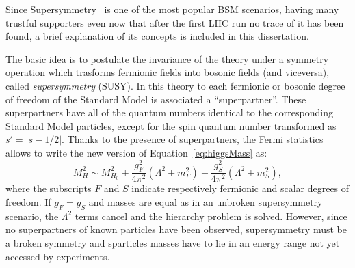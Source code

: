 Since Supersymmetry~\cite{Wess:320631} is one of the most popular
BSM scenarios, having many trustful supporters even
now that after the first LHC run no trace of it
has been found, a brief explanation of its concepts
is included in this dissertation.

The basic idea is to postulate the invariance 
of the theory under a symmetry operation which 
trasforms fermionic fields into bosonic fields 
(and viceversa), called \textit{supersymmetry} (SUSY). 
In this theory to each fermionic or bosonic 
degree of freedom of the Standard Model is associated a 
``superpartner''. These superpartners have all 
of the quantum numbers identical to the corresponding 
Standard Model particles, except for the spin quantum number 
transformed as $s' = |s - 1/2|$. Thanks to the 
presence of superpartners, the Fermi statistics 
allows to write the new version of Equation~\ref{eq:higgsMass} as:
\begin{equation}
\label{eq:higgsMassSUSY}
M_{H}^{2} \sim M_{H_{0}}^{2} + \dfrac{g_{F}^{2}}{4\pi^{2}} (\Lambda^{2} + m_{F}^{2} ) - \dfrac{g_{S}^{2}}{4\pi^{2}} (\Lambda^{2} + m_{S}^{2} ),
\end{equation} 
where the subscripts $F$ and $S$ indicate respectively 
fermionic and scalar degrees of freedom. If $g_{F} = g_{S}$ 
and masses are equal as in an unbroken supersymmetry scenario, 
the $\Lambda^2$ terms cancel and the hierarchy problem is solved. 
However, since no superpartners of known particles 
have been observed,  supersymmetry must be a broken 
symmetry and sparticles masses have to lie in an 
energy range not yet accessed by experiments.

